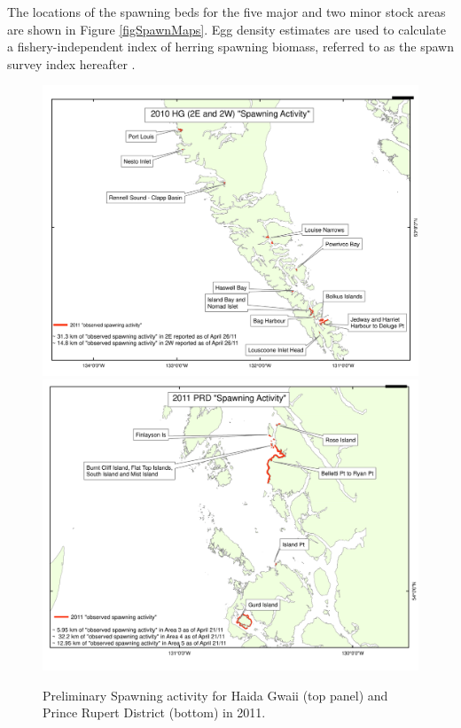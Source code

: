 The locations of the spawning beds for the five major and two minor stock areas are shown in Figure \ref{figSpawnMaps}.  Egg density estimates are used to calculate a fishery-independent index of herring spawning biomass, referred to as the spawn survey index hereafter \citep{schweigert2001stock}.

\begin{figure}[!tbp]
	\centering
	\includegraphics[scale=0.5]{../Figs/PBSfigs/2011-HG-Prelim-WG.pdf}\\
	\includegraphics[scale=0.5]{../Figs/PBSfigs/2011-PRD-Prelim-WG.pdf}
	\caption{Preliminary Spawning activity for Haida Gwaii (top panel) and Prince Rupert District (bottom) in 2011.}
\end{figure}
